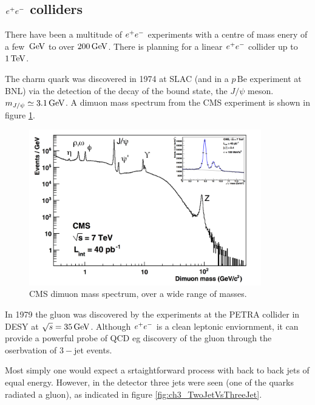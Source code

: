 \subsection{\texorpdfstring{$e^+ e^-$}{EE} colliders}

There have been a multitude of $e^+ e^-$ experiments with a centre of mass enery of a few $\mathrm{\,GeV}$ to over $200 \mathrm{\,GeV}$.  There is planning for a linear $e^+ e^-$ collider up to $1\mathrm{\,TeV}$.

The charm quark was discovered in 1974 at SLAC (and in a $p \, \textrm{Be}$ experiment at BNL) via the detection of the decay of the bound state, the $J/\psi$ meson.  $m_{J/\psi} \simeq 3.1 \mathrm{\,GeV}$.  A dimuon mass spectrum from the CMS experiment is shown in figure \ref{fig:ch3_mumuspectrumCMS}.

\begin{figure}[!htb]
  \begin{center}
    \includegraphics[width=0.9\textwidth]{images/chapter_3/mumuspectrumCMS.pdf}
    \caption[CMS dimuon mass spectrum]{CMS dimuon mass spectrum, over a wide range of masses. \cite{mumuspectrumCMS}}
    \label{fig:ch3_mumuspectrumCMS}
  \end{center}
\end{figure}

In 1979 the gluon was discovered by the experiments at the PETRA collider in DESY at $\sqrt{s} = 35\mathrm{\,GeV}$.  Although $e^+ e^-$ is a clean leptonic enviornment, it can provide a powerful probe of QCD eg discovery of the gluon through the oserbvation of $3-$jet events.

Most simply one would expect a srtaightforward process with back to back jets of equal energy.  However, in the detector three jets were seen (one of the quarks radiated a gluon), as indicated in figure \ref{fig:ch3_TwoJetVsThreeJet}.

